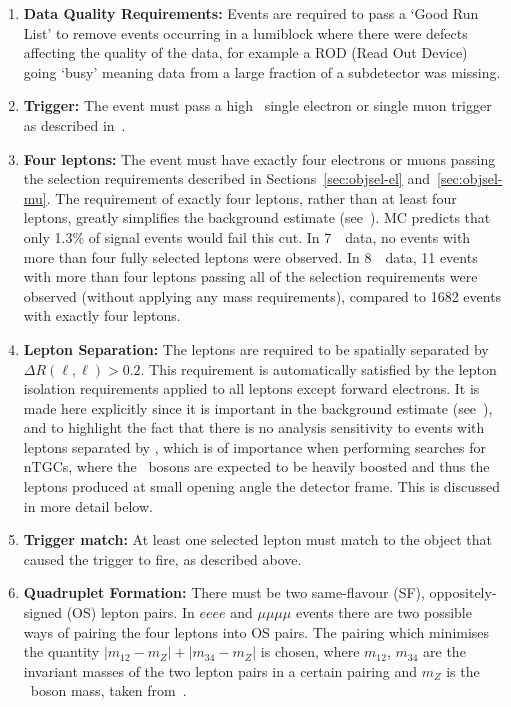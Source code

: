 \begin{enumerate}

    \item {\bf Data Quality Requirements:} Events are required to pass a `Good
    Run List' to remove events occurring in a lumiblock where there were defects
    affecting the quality of the data, for example a ROD (Read Out Device) going `busy' meaning
    data from a large fraction of a subdetector was missing.

    \item {\bf Trigger:} The event must pass a high \pt\ single electron or single
    muon trigger as described in~.

    \item {\bf Four leptons:} The event must have exactly four electrons or
    muons passing the selection requirements described in
    Sections~\ref{sec:objsel-el} and~\ref{sec:objsel-mu}. The requirement of
    exactly four leptons, rather than at least four leptons, greatly simplifies
    the background estimate (see~). MC predicts that only
    1.3\% of signal events would fail this cut. 
    In 7~\tev\ data, no events with more
    than four fully selected leptons were observed.
    In 8~\tev\ data, 11 events with more than four leptons passing all of the
    selection requirements were observed (without applying any mass
    requirements), compared to 1682 events with exactly four leptons.

    \item {\bf Lepton Separation:} The leptons are required to be spatially separated by
    $\Delta{R}(\ell,\ell)>0.2$. This requirement is automatically satisfied by
    the lepton isolation requirements applied to all leptons except forward
    electrons. It is made here explicitly since it is important in the
    background estimate (see~), and to highlight the fact that there is no
    analysis sensitivity to events with leptons separated by ,
    which is of importance when performing searches for nTGCs, where the \Z\
    bosons are expected to be heavily boosted and thus the leptons produced at
    small opening angle the detector frame. This is discussed in more detail below.

    \item {\bf Trigger match:} At least one selected lepton must match to the
    object that caused the trigger to fire, as described above. 

    \item {\bf Quadruplet Formation:} There must be two same-flavour (SF),
    oppositely-signed (OS) lepton pairs. In $eeee$ and $\mu\mu\mu\mu$ events there are
    two possible ways of pairing the four leptons into OS pairs. The pairing which
    minimises the quantity $|m_{12}-m_{Z}|+|m_{34}-m_{Z}|$ is chosen, where
    $m_{12}$, $m_{34}$ are the invariant masses of the two lepton pairs in a certain
    pairing and $m_Z$ is the \Z\ boson mass, taken from~\cite{PDG}.


\end{enumerate}

